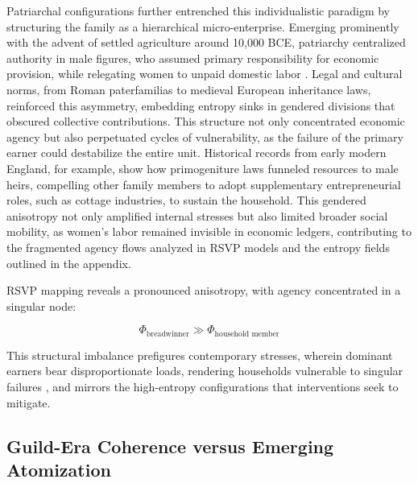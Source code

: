 \documentclass[11pt]{article}
\begin{document}
Patriarchal configurations further entrenched this individualistic paradigm by structuring the family as a hierarchical micro-enterprise. Emerging prominently with the advent of settled agriculture around 10,000 BCE, patriarchy centralized authority in male figures, who assumed primary responsibility for economic provision, while relegating women to unpaid domestic labor \citep{stone1977family}. Legal and cultural norms, from Roman paterfamilias to medieval European inheritance laws, reinforced this asymmetry, embedding entropy sinks in gendered divisions that obscured collective contributions. This structure not only concentrated economic agency but also perpetuated cycles of vulnerability, as the failure of the primary earner could destabilize the entire unit. Historical records from early modern England, for example, show how primogeniture laws funneled resources to male heirs, compelling other family members to adopt supplementary entrepreneurial roles, such as cottage industries, to sustain the household. This gendered anisotropy not only amplified internal stresses but also limited broader social mobility, as women's labor remained invisible in economic ledgers, contributing to the fragmented agency flows analyzed in RSVP models and the entropy fields outlined in the appendix.

RSVP mapping reveals a pronounced anisotropy, with agency concentrated in a singular node:

\begin{equation}
\Phi_{\text{breadwinner}} \gg \Phi_{\text{household member}}
\end{equation}

This structural imbalance prefigures contemporary stresses, wherein dominant earners bear disproportionate loads, rendering households vulnerable to singular failures \citep{thompson1963making}, and mirrors the high-entropy configurations that interventions seek to mitigate.

\subsection{Guild-Era Coherence versus Emerging Atomization}
\end{document}
